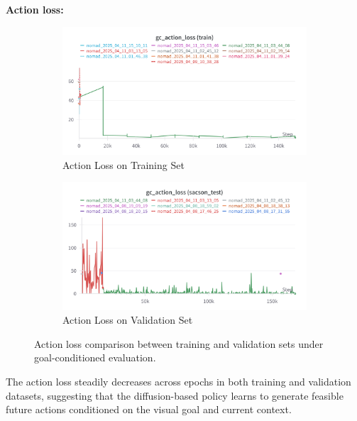 \documentclass[12pt]{article}
\begin{document}
\noindent \textbf{Action loss:}\\
\begin{figure}[H]
    \centering
    \begin{subfigure}[b]{0.48\textwidth}
        \centering
        \includegraphics[width=\textwidth]{images/gc_actionloss_nomad.png}
        \caption{Action Loss on Training Set}
        \label{fig:gc_action_loss_train}
    \end{subfigure}
    \hfill
    \begin{subfigure}[b]{0.48\textwidth}
        \centering
        \includegraphics[width=\textwidth]{images/gc_actionloss_test_nomad.png}
        \caption{Action Loss on Validation Set}
        \label{fig:gc_action_loss_val}
    \end{subfigure}
    \caption{Action loss comparison between training and validation sets under goal-conditioned evaluation.}
\end{figure}
The action loss steadily decreases across epochs in both training and validation datasets, suggesting that the diffusion-based policy learns to generate feasible future actions conditioned on the visual goal and current context.\\
\end{document}
